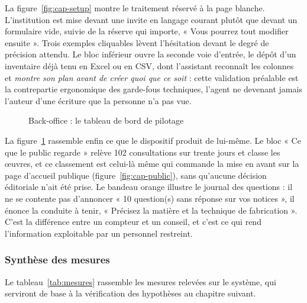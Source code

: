 La figure~\ref{fig:cap-setup} montre le traitement réservé à la page blanche.
L'institution est mise devant une invite en langage courant plutôt que devant un
formulaire vide, suivie de la réserve qui importe, « Vous pourrez tout modifier
ensuite ». Trois exemples cliquables lèvent l'hésitation devant le degré de
précision attendu. Le bloc inférieur ouvre la seconde voie d'entrée, le dépôt
d'un inventaire déjà tenu en Excel ou en CSV, dont l'assistant reconnaît les
colonnes et \emph{montre son plan avant de créer quoi que ce soit} : cette
validation préalable est la contrepartie ergonomique des garde-fous techniques,
l'agent ne devenant jamais l'auteur d'une écriture que la personne n'a pas vue.

\begin{figure}[!ht]
\centering
{}
\caption{Back-office : le tableau de bord de pilotage}
\label{fig:cap-dashboard}
\end{figure}

La figure~\ref{fig:cap-dashboard} rassemble enfin ce que le dispositif produit de
lui-même. Le bloc « Ce que le public regarde » relève 102 consultations sur
trente jours et classe les œuvres, et ce classement est celui-là même qui
commande la mise en avant sur la page d'accueil publique
(figure~\ref{fig:cap-public}), sans qu'aucune décision éditoriale n'ait été
prise. Le bandeau orange illustre le journal des questions : il ne se contente
pas d'annoncer « 10 question(s) sans réponse sur vos notices », il énonce la
conduite à tenir, « Précisez la matière et la technique de fabrication ». C'est
la différence entre un compteur et un conseil, et c'est ce qui rend
l'information exploitable par un personnel restreint.


\subsubsection{Synthèse des mesures}

Le tableau~\ref{tab:mesures} rassemble les mesures relevées sur le système, qui
serviront de base à la vérification des hypothèses au chapitre suivant.


